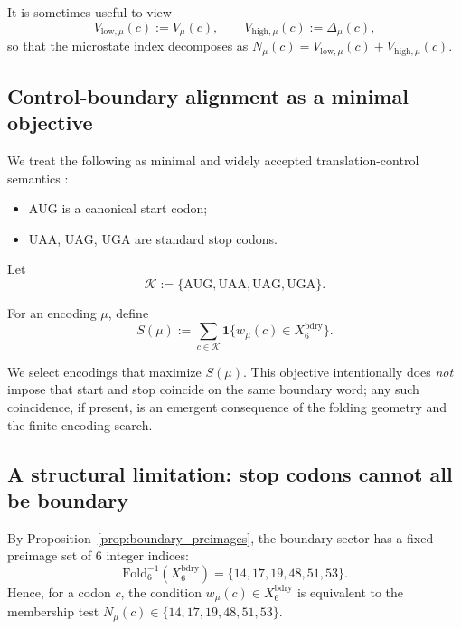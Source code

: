 \begin{remark}
It is sometimes useful to view
\[
V_{\mathrm{low},\mu}(c):=V_\mu(c),\qquad V_{\mathrm{high},\mu}(c):=\Delta_\mu(c),
\]
so that the microstate index decomposes as $N_\mu(c)=V_{\mathrm{low},\mu}(c)+V_{\mathrm{high},\mu}(c)$.
\end{remark}

\subsection{Control-boundary alignment as a minimal objective}
\label{sec:control_objective}

We treat the following as minimal and widely accepted translation-control semantics \cite{Alberts2014,Crick1966,NirenbergMatthaei1961}:
\begin{itemize}
\item $\mathrm{AUG}$ is a canonical start codon;
\item $\mathrm{UAA}$, $\mathrm{UAG}$, $\mathrm{UGA}$ are standard stop codons.
\end{itemize}

Let
\[
\mathcal{K}:=\{\mathrm{AUG},\mathrm{UAA},\mathrm{UAG},\mathrm{UGA}\}.
\]

\begin{definition}
\label{def:control_boundary_score}
For an encoding $\mu$, define
\[
S(\mu):=\sum_{c\in\mathcal{K}}\mathbf{1}\{w_\mu(c)\in X_6^{\mathrm{bdry}}\}.
\]
\end{definition}

We select encodings that maximize $S(\mu)$.
This objective intentionally does \emph{not} impose that start and stop coincide on the same boundary word; any such coincidence, if present, is an emergent consequence of the folding geometry and the finite encoding search.

\subsection{A structural limitation: stop codons cannot all be boundary}
\label{sec:stop_limit}

By Proposition~\ref{prop:boundary_preimages}, the boundary sector has a fixed preimage set of $6$ integer indices:
\[
\mathrm{Fold}_6^{-1}(X_6^{\mathrm{bdry}})=\{14,17,19,48,51,53\}.
\]
Hence, for a codon $c$, the condition $w_\mu(c)\in X_6^{\mathrm{bdry}}$ is equivalent to the membership test $N_\mu(c)\in\{14,17,19,48,51,53\}$.

